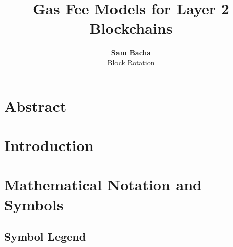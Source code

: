 \documentclass[letterpaper,10pt]{article} %
\begin{document}
\title{Gas Fee Models for Layer 2 Blockchains} %
\author{
{\bf Sam Bacha}\\ %
{Block Rotation}
} %

\maketitle


\section*{Abstract} %

\section{Introduction}

\tableofcontents %
\newpage
\section{Mathematical Notation and Symbols} %

\subsection{Symbol Legend} %
\end{document}
